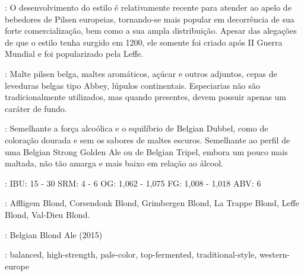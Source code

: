 : O desenvolvimento do estilo é relativamente recente para atender ao apelo de bebedores de Pilsen europeias, tornando-se mais popular em decorrência de sua forte comercialização, bem como a sua ampla distribuição. Apesar das alegações de que o estilo tenha surgido em 1200, ele somente foi criado após II Guerra Mundial e foi popularizado pela Leffe.

: Malte pilsen belga, maltes aromáticos, açúcar e outros adjuntos, cepas de leveduras belgas tipo Abbey, lúpulos continentais. Especiarias não são tradicionalmente utilizados, mas quando presentes, devem possuir apenas um caráter de fundo.

: Semelhante a força alcoólica e o equilíbrio de Belgian Dubbel, como de coloração dourada e sem os sabores de maltes escuros. Semelhante ao perfil de uma Belgian Strong Golden Ale ou de Belgian Tripel, embora um pouco mais maltada, não tão amarga e mais baixo em relação ao álcool.

: IBU: 15 - 30
SRM: 4 - 6
OG: 1,062 - 1,075
FG: 1,008 - 1,018
ABV: 6%

: Affligem Blond, Corsendonk Blond, Grimbergen Blond, La Trappe Blond, Leffe Blond, Val-Dieu Blond.

: Belgian Blond Ale (2015)

: balanced, high-strength, pale-color, top-fermented, traditional-style, western-europe
